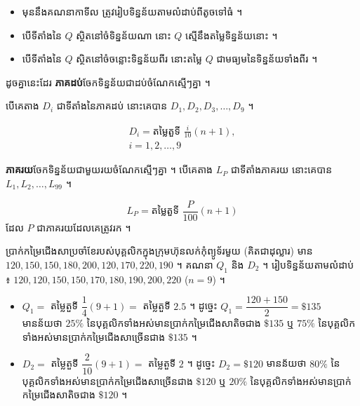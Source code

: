 \begin{note}[វិធាន]
\begin{itemize}
  \item មុននឹងគណនាកាទីល ត្រូវរៀបទិន្នន័យតាមលំដាប់ពីតូចទៅធំ ។
  \item បើទីតាំងនៃ $Q$ ស្ថិតនៅចំទិន្នន័យណា នោះ $Q$ ស្មើនឹងតម្លៃទិន្នន័យនោះ ។
  \item បើទីតាំងនៃ $Q$ ស្ថិតនៅចំចន្លោះទិន្នន័យពីរ នោះតម្លៃ $Q$ ជាមធ្យមនៃទិន្នន័យទាំងពីរ ។
\end{itemize}
\end{note}

ដូចគ្នានេះដែរ \textbf{ភាគដប់}ចែកទិន្នន័យជាដប់ចំណែកស្មើៗគ្នា ។
\begin{center}
\end{center}
បើគេតាង $D_i$ ជាទីតាំងនៃភាគដប់ នោះគេបាន $D_1, D_2, D_3, \dots, D_9$ ។
\begin{formulaBox}
\[
\begin{gathered}
D_i = \text{តម្លៃតួទី } \frac{i}{10}(n + 1),\\
i = 1, 2, \dots, 9
\end{gathered}
\]
\end{formulaBox}
\textbf{ភាគរយ}ចែកទិន្នន័យជាមួយរយចំណែកស្មើៗគ្នា ។ បើគេតាង $L_P$ ជាទីតាំងភាគរយ នោះគេបាន $L_1, L_2, \dots, L_{99}$ ។
\begin{formulaBox}
\[
L_P = \text{តម្លៃតួទី } \frac{P}{100}(n + 1)
\]
ដែល $P$ ជាភាគរយដែលគេត្រូវរក ។
\end{formulaBox}

\begin{example}[លំហាត់គំរូ]
ប្រាក់កម្រៃជើងសាប្រចាំខែរបស់បុគ្គលិកក្នុងក្រុមហ៊ុនលក់កុំព្យូទ័រមួយ (គិតជាដុល្លារ) មាន $120, 150, 150, 180, 200, 120, 170, 220, 190$ ។ គណនា $Q_1$ និង $D_2$ ។
\ans
រៀបទិន្នន័យតាមលំដាប់ ៖ $120, 120, 150, 150, 170, 180, 190, 200, 220$ ($n = 9$) ។
\begin{itemize}
  \item $Q_1 =$ តម្លៃតួទី $\dfrac{1}{4}(9 + 1) =$ តម្លៃតួទី $2.5$ ។ ដូច្នេះ $Q_1 = \dfrac{120 + 150}{2} = \$135$ មានន័យថា $25\%$ នៃបុគ្គលិកទាំងអស់មានប្រាក់កម្រៃជើងសាតិចជាង $\$135$ ឬ $75\%$ នៃបុគ្គលិកទាំងអស់មានប្រាក់កម្រៃជើងសាច្រើនជាង $\$135$ ។
  \item $D_2 =$ តម្លៃតួទី $\dfrac{2}{10}(9 + 1) =$ តម្លៃតួទី $2$ ។ ដូច្នេះ $D_2 = \$120$ មានន័យថា $80\%$ នៃបុគ្គលិកទាំងអស់មានប្រាក់កម្រៃជើងសាច្រើនជាង $\$120$ ឬ $20\%$ នៃបុគ្គលិកទាំងអស់មានប្រាក់កម្រៃជើងសាតិចជាង $\$120$ ។
\end{itemize}
\end{example}

